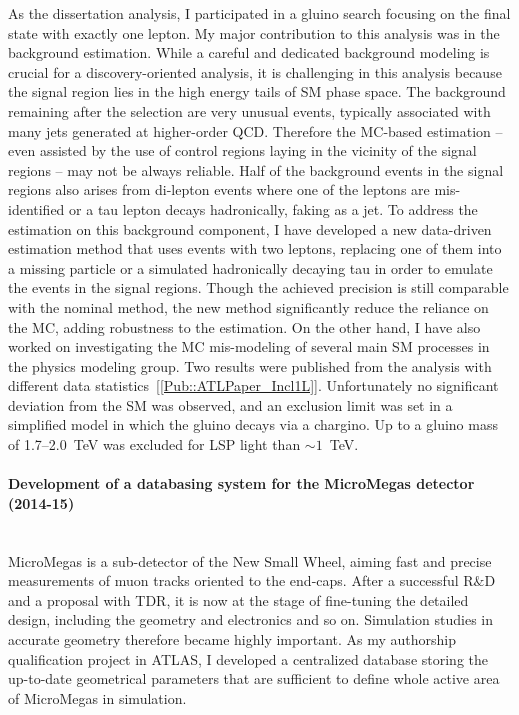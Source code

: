 \documentclass[12pt]{article}
\newcommand{\Subsubsection}[1]{\subsubsection*{#1}
\addcontentsline{toc}{subsubsection}{#1}}
\begin{document}
As the dissertation analysis, I participated in a gluino search focusing on the final state with exactly one lepton. 
My major contribution to this analysis was in the background estimation. 
While a careful and dedicated background modeling is crucial for a discovery-oriented analysis, 
it is challenging in this analysis because the signal region lies in the high energy tails of SM phase space. 
The background remaining after the selection are very unusual events, 
typically associated with many jets generated at higher-order QCD.
Therefore the MC-based estimation -- even assisted by the use of control regions laying in the vicinity of the signal regions -- may not be always reliable.
Half of the background events in the signal regions also arises from di-lepton events where one of the leptons are mis-identified or a tau lepton decays hadronically, faking as a jet.
To address the estimation on this background component, I have developed a new data-driven estimation method that uses events with two leptons, 
replacing one of them into a missing particle or a simulated hadronically decaying tau
in order to emulate the events in the signal regions.
Though the achieved precision is still comparable with the nominal method, the new method significantly reduce the reliance on the MC, adding robustness to the estimation.
On the other hand, I have also worked on investigating the MC mis-modeling of several main SM processes in the physics modeling group.
Two results were published from the analysis with different data statistics~[\ref{Pub::ATLPaper_Incl1L}]. 
Unfortunately no significant deviation from the SM was observed, and an exclusion limit was set in a simplified model in which the gluino decays via a chargino.
Up to a gluino mass of 1.7--2.0~TeV was excluded for LSP light than $\sim1$~TeV. 

\paragraph{Development of a databasing system for the MicroMegas detector (2014-15)}  \phantom{k} \vspace{1mm} \\
MicroMegas is a sub-detector of the New Small Wheel, aiming fast and precise measurements of muon tracks oriented to the end-caps. 
After a successful  R$\&$D and a proposal with TDR, it is now at the stage of fine-tuning the detailed design, 
including the geometry and electronics and so on. 
Simulation studies in accurate geometry therefore became highly important. 
As my authorship qualification project in ATLAS, I developed a centralized database storing the up-to-date geometrical parameters that are sufficient to define whole active area of MicroMegas in simulation.  \\ \\
\end{document}
